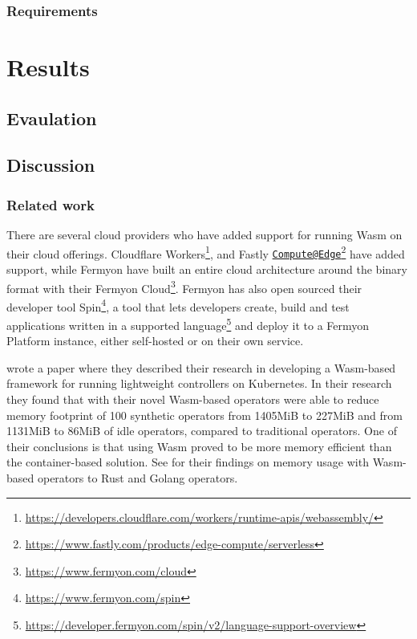 \documentclass[
  table]{report}
\begin{document}
\section{Requirements}

\newpage

\part{Results}

\newpage
\chapter{Evaulation}

\newpage
\chapter{Discussion}

\section{Related work}
\label{sect:related-work}


There are several cloud providers who have added support for running
\ac{Wasm} on their cloud offerings. Cloudflare Workers\footnote{\url{https://developers.cloudflare.com/workers/runtime-apis/webassembly/}},
and Fastly
\href{mailto:Compute@Edge}{\nolinkurl{Compute@Edge}}\footnote{\url{https://www.fastly.com/products/edge-compute/serverless}}
have added support, while Fermyon have built an entire cloud
architecture around the binary format with their Fermyon
Cloud\footnote{\url{https://www.fermyon.com/cloud}}. Fermyon has also
open sourced their developer tool Spin\footnote{\url{https://www.fermyon.com/spin}},
a tool that lets developers create, build and test applications written
in a supported language\footnote{\url{https://developer.fermyon.com/spin/v2/language-support-overview}}
and deploy it to a Fermyon Platform instance, either self-hosted or on
their own service.

\citet{sebrechtsAdaptingKubernetesControllers2022} wrote a paper where
they described their research in developing a \ac{Wasm}-based framework
for running lightweight controllers on Kubernetes. In their research
they found that with their novel \ac{Wasm}-based operators were able to
reduce memory footprint of 100 synthetic operators from 1405MiB to
227MiB and from 1131MiB to 86MiB of idle operators, compared to
traditional operators. One of their conclusions is that using \ac{Wasm}
proved to be more memory efficient than the container-based solution.
See  for their findings on memory usage with
\ac{Wasm}-based operators to Rust and Golang operators.
\end{document}
